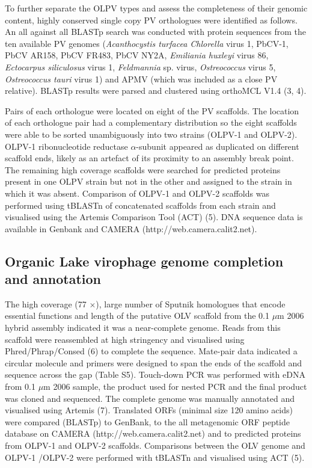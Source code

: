 To further separate the OLPV types and assess the completeness of their genomic content, highly conserved single copy PV orthologues were identified as follows. 
An all against all BLASTp search was conducted with protein sequences from the ten available PV genomes 
(\emph{Acanthocystis turfacea Chlorella} virus 1, PbCV-1, PbCV AR158, PbCV FR483, PbCV NY2A, \emph{Emiliania huxleyi} virus 86, \emph{Ectocarpus siliculosus} virus 1, \emph{Feldmannia} sp. virus, \emph{Ostreococcus} virus 5, \emph{Ostreococcus tauri} virus 1) and APMV (which was included as a close PV relative). 
BLASTp results were parsed and clustered using orthoMCL V1.4 (3, 4). 

Pairs of each orthologue were located on eight of the PV scaffolds. 
The location of each orthologue pair had a complementary distribution so the eight scaffolds were able to be sorted unambiguously into two strains (OLPV-1 and OLPV-2). 
OLPV-1 ribonucleotide reductase $\alpha$-subunit appeared as duplicated on different scaffold ends, likely as an artefact of its proximity to an assembly break point. 
The remaining high coverage scaffolds were searched for predicted proteins present in one OLPV strain but not in the other and assigned to the strain in which it was absent. 
Comparison of OLPV-1 and OLPV-2 scaffolds was performed using tBLASTn of concatenated scaffolds from each strain and visualised using the Artemis Comparison Tool (ACT) (5). 
DNA sequence data is available in Genbank and CAMERA (http://web.camera.calit2.net).

\subsection[Genome completion and annotation]{Organic Lake virophage genome completion and annotation}
The high coverage (77 $\times$), large number of Sputnik homologues that encode essential functions and length of the putative OLV scaffold from the 0.1 $\mu$m 2006 hybrid assembly indicated it was a near-complete genome. 
Reads from this scaffold were reassembled at high stringency and visualised using Phred/Phrap/Consed (6) to complete the sequence. 
Mate-pair data indicated a circular molecule and primers were designed to span the ends of the scaffold and sequence across the gap (Table S5). 
Touch-down PCR was performed with eDNA from 0.1 $\mu$m 2006 sample, the product used for nested PCR and the final product was cloned and sequenced. 
The complete genome was manually annotated and visualised using Artemis (7). 
Translated ORFs (minimal size 120 amino acids) were compared (BLASTp) to GenBank, to the all metagenomic ORF peptide database on CAMERA (http://web.camera.calit2.net) and to predicted proteins from OLPV-1 and OLPV-2 scaffolds. 
Comparisons between the OLV genome and OLPV-1 /OLPV-2 were performed with tBLASTn and visualised using ACT (5). 

